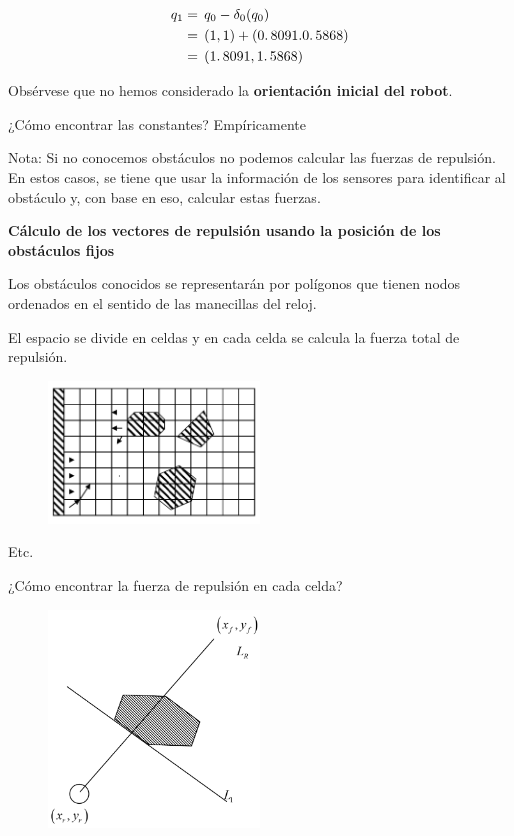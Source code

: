 \begin{equation*}
\begin{aligned}
q_1 & = \,  q_0-\delta_0 (q_0) \\
 & = \, (1,1)+(0\ldotp8091.0\ldotp5868) \\
 & = \, (1\ldotp8091,1\ldotp5868) 
\end{aligned}
\end{equation*}

Obsérvese que no hemos considerado la \textbf{orientación inicial del robot}.



¿Cómo encontrar las constantes? Empíricamente

Nota: Si no conocemos obstáculos no podemos calcular las fuerzas de repulsión. En estos casos, se tiene que usar la información de los sensores para identificar al obstáculo y, con base en eso, calcular estas fuerzas.

\textbf{Cálculo de los vectores de repulsión usando la posición de los obstáculos fijos}

Los obstáculos conocidos se representarán por polígonos que tienen nodos ordenados en el sentido de las manecillas del reloj.

El espacio se divide en celdas y en cada celda se calcula la fuerza total de repulsión.

\begin{figure}[h!]
	\centering
	\includegraphics[width=0.5\textwidth]{images/img60.png}
	\label{figura60}
\end{figure}

Etc.

¿Cómo encontrar la fuerza de repulsión en cada celda?

\begin{figure}[h!]
	\centering
	\includegraphics[width=0.5\textwidth]{images/img61.png}
	\label{figura61}
\end{figure}

